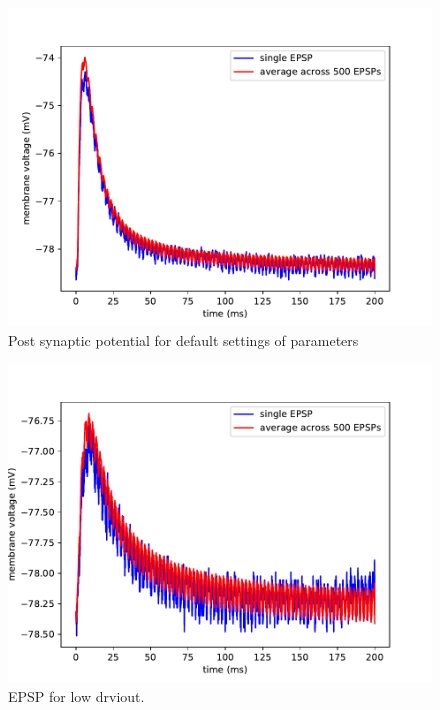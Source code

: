 \documentclass[10pt,a4paper]{article}
\begin{document}
\begin{figure}[ht]
    \centering
    \includegraphics[width=\textwidth]{figures/epsp_default.pdf}
    \caption{Post synaptic potential for default settings of parameters}
    \label{fig:epsp_default}
\end{figure}
\begin{figure}[ht]
    \centering
    \includegraphics[width=\textwidth]{figures/epsp_out_-.pdf}
    \caption{EPSP for low drviout.}
    \label{fig:epsp_out-}
\end{figure}
\end{document}
